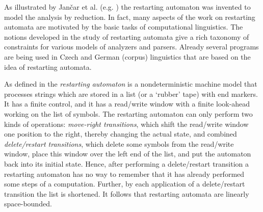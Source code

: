 As illustrated by Jančar et al. (e.g. \cite{JMPV99}) the restarting automaton was invented to model the analysis by reduction. In fact, many aspects of the work on restarting automata are motivated by the basic tasks of computational linguistics. The notions developed in the study of restarting automata give a rich taxonomy of constraints for various models of analyzers and parsers. Already several programs are being used in Czech and German (corpus) linguistics that are based on the idea of restarting automata.

As defined in \cite{JMPV95} the \emph{restarting automaton} is a nondeterministic machine model that processes strings which are stored in a list (or a ‘rubber’ tape) with end markers. It has a finite control, and it has a read/write window with a finite look-ahead working on the list of symbols. The restarting automaton can only perform two kinds of operations:  \emph{move-right transitions}, which shift the read/write window one position to the right, thereby changing the actual state, and combined \emph{delete/restart transitions}, which delete some symbols from the read/write window, place this window over the left end of the list, and put the automaton back into its initial state. Hence, after performing a delete/restart transition a restarting automaton has no way to remember that it has already performed some steps of a computation. Further, by each application of a delete/restart transition the list is shortened. It follows that restarting automata are linearly space-bounded.

